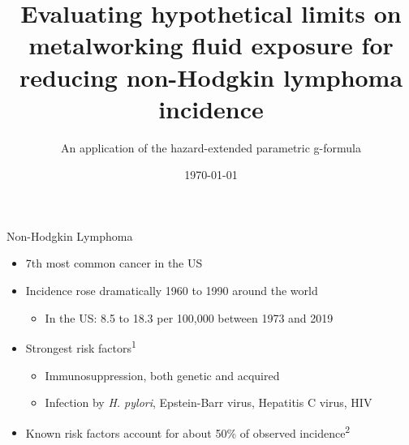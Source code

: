 \documentclass[
  11pt,
  ignorenonframetext,
]{beamer}
\title{Evaluating hypothetical limits on metalworking fluid exposure for
reducing non-Hodgkin lymphoma incidence}
\subtitle{An application of the hazard-extended parametric g-formula}
\author{}
\date{\vspace{-2.5em}\today}
\providecommand{\tightlist}{%
  \setlength{\itemsep}{0pt}\setlength{\parskip}{0pt}}
\begin{document}
\frame{\titlepage}

\begin{frame}{Non-Hodgkin Lymphoma}
\protect\hypertarget{non-hodgkin-lymphoma}{}
\begin{itemize}
\tightlist
\item
  7th most common cancer in the US
\item
  Incidence rose dramatically 1960 to 1990 around the world

  \begin{itemize}
  \tightlist
  \item
    In the US: 8.5 to 18.3 per 100,000 between 1973 and 2019
  \end{itemize}
\item
  Strongest risk factors\textsuperscript{1}

  \begin{itemize}
  \tightlist
  \item
    Immunosuppression, both genetic and acquired
  \item
    Infection by \emph{H. pylori}, Epstein-Barr virus, Hepatitis C
    virus, HIV
  \end{itemize}
\item
  Known risk factors account for about 50\% of observed
  incidence\textsuperscript{2}
\end{itemize}

\end{frame}
\end{document}
